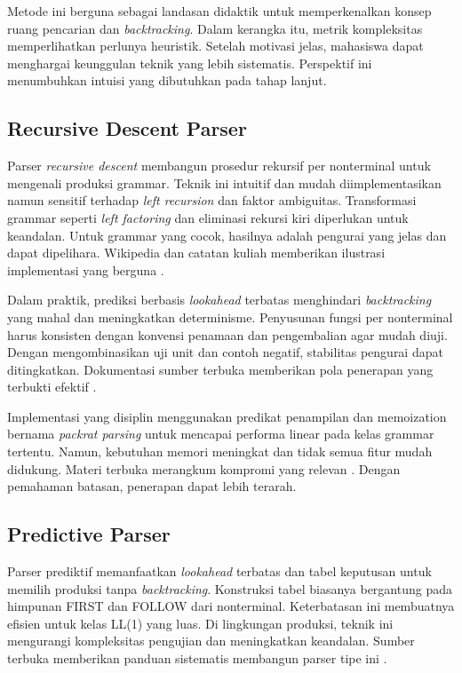 \documentclass[../main.tex]{subfiles}
\begin{document}
Metode ini berguna sebagai landasan didaktik untuk memperkenalkan konsep ruang pencarian dan \emph{backtracking}. Dalam kerangka itu, metrik kompleksitas memperlihatkan perlunya heuristik. Setelah motivasi jelas, mahasiswa dapat menghargai keunggulan teknik yang lebih sistematis. Perspektif ini menumbuhkan intuisi yang dibutuhkan pada tahap lanjut.

\subsection{Recursive Descent Parser}
Parser \emph{recursive descent} membangun prosedur rekursif per nonterminal untuk mengenali produksi grammar. Teknik ini intuitif dan mudah diimplementasikan namun sensitif terhadap \emph{left recursion} dan faktor ambiguitas. Transformasi grammar seperti \emph{left factoring} dan eliminasi rekursi kiri diperlukan untuk keandalan. Untuk grammar yang cocok, hasilnya adalah pengurai yang jelas dan dapat dipelihara. Wikipedia dan catatan kuliah memberikan ilustrasi implementasi yang berguna \citep{WikiRecursiveDescent,CS143}.

Dalam praktik, prediksi berbasis \emph{lookahead} terbatas menghindari \emph{backtracking} yang mahal dan meningkatkan determinisme. Penyusunan fungsi per nonterminal harus konsisten dengan konvensi penamaan dan pengembalian agar mudah diuji. Dengan mengombinasikan uji unit dan contoh negatif, stabilitas pengurai dapat ditingkatkan. Dokumentasi sumber terbuka memberikan pola penerapan yang terbukti efektif \citep{CS143}.

Implementasi yang disiplin menggunakan predikat penampilan dan memoization bernama \emph{packrat parsing} untuk mencapai performa linear pada kelas grammar tertentu. Namun, kebutuhan memori meningkat dan tidak semua fitur mudah didukung. Materi terbuka merangkum kompromi yang relevan \citep{CS143}. Dengan pemahaman batasan, penerapan dapat lebih terarah.

\subsection{Predictive Parser}
Parser prediktif memanfaatkan \emph{lookahead} terbatas dan tabel keputusan untuk memilih produksi tanpa \emph{backtracking}. Konstruksi tabel biasanya bergantung pada himpunan FIRST dan FOLLOW dari nonterminal. Keterbatasan ini membuatnya efisien untuk kelas LL(1) yang luas. Di lingkungan produksi, teknik ini mengurangi kompleksitas pengujian dan meningkatkan keandalan. Sumber terbuka memberikan panduan sistematis membangun parser tipe ini \citep{WikiPredictiveParser}.
\end{document}
